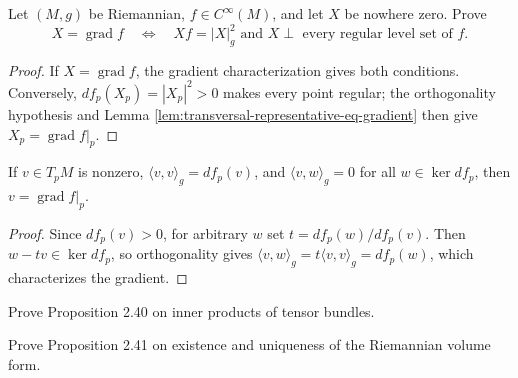 \begin{exercise}\label{prob:gradient-characterization}
\leanok
{}
Let $(M,g)$ be Riemannian, $f\in C^\infty(M)$, and let $X$ be nowhere zero. Prove
\[
X=\operatorname{grad}f\quad\Longleftrightarrow\quad Xf=|X|_g^2\text{ and }X\perp\text{ every regular level set of }f.
\]
\end{exercise}

\begin{proof}
\leanok
\sketch If $X=\operatorname{grad}f$, the gradient characterization gives both conditions. Conversely, $df_p(X_p)=|X_p|^2>0$ makes every point regular; the orthogonality hypothesis and Lemma \ref{lem:transversal-representative-eq-gradient} then give $X_p=\operatorname{grad}f|_p$.
\end{proof}

\begin{lemma}
\label{lem:transversal-representative-eq-gradient}
\leanok
{}
If $v\in T_pM$ is nonzero, $\langle v,v\rangle_g=df_p(v)$, and $\langle v,w\rangle_g=0$ for all $w\in\ker df_p$, then $v=\operatorname{grad}f|_p$.
\end{lemma}

\begin{proof}
\leanok
\sketch Since $df_p(v)>0$, for arbitrary $w$ set $t=df_p(w)/df_p(v)$. Then $w-tv\in\ker df_p$, so orthogonality gives $\langle v,w\rangle_g=t\langle v,v\rangle_g=df_p(w)$, which characterizes the gradient.
\end{proof}

\begin{exercise}\label{prob:inner-products-tensor-bundles}
Prove Proposition 2.40 on inner products of tensor bundles.
\end{exercise}

\begin{exercise}
\label{prob:riemannian-volume-form-existence}
\leanok
{}
Prove Proposition 2.41 on existence and uniqueness of the Riemannian volume form.
\end{exercise}

